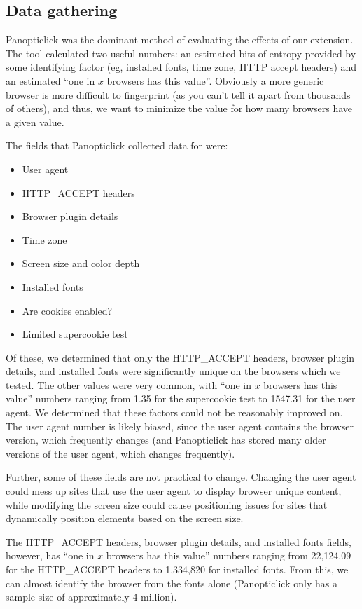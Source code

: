 \documentclass[12pt,a4paper]{article}
\begin{document}
\subsection{Data gathering}
Panopticlick was the dominant method of evaluating the effects of our extension. The tool calculated two useful numbers: an estimated bits of entropy provided by some identifying factor (eg, installed fonts, time zone, HTTP accept headers) and an estimated ``one in $x$ browsers has this value''. Obviously a more generic browser is more difficult to fingerprint (as you can't tell it apart from thousands of others), and thus, we want to minimize the value for how many browsers have a given value.

The fields that Panopticlick collected data for were:

\begin{itemize}
	\item User agent
	\item HTTP\_ACCEPT headers
	\item Browser plugin details
	\item Time zone
	\item Screen size and color depth
	\item Installed fonts
	\item Are cookies enabled?
	\item Limited supercookie test
\end{itemize}

Of these, we determined that only the HTTP\_ACCEPT headers, browser plugin details, and installed fonts were significantly unique on the browsers which we tested. The other values were very common, with ``one in $x$ browsers has this value'' numbers ranging from 1.35 for the supercookie test to 1547.31 for the user agent. We determined that these factors could not be reasonably improved on. The user agent number is likely biased, since the user agent contains the browser version, which frequently changes (and Panopticlick has stored many older versions of the user agent, which changes frequently).

Further, some of these fields are not practical to change. Changing the user agent could mess up sites that use the user agent to display browser unique content, while modifying the screen size could cause positioning issues for sites that dynamically position elements based on the screen size.

The HTTP\_ACCEPT headers, browser plugin details, and installed fonts fields, however, has ``one in $x$ browsers has this value'' numbers ranging from 22,124.09 for the HTTP\_ACCEPT headers to 1,334,820 for installed fonts. From this, we can almost identify the browser from the fonts alone (Panopticlick only has a sample size of approximately 4 million).
\end{document}
